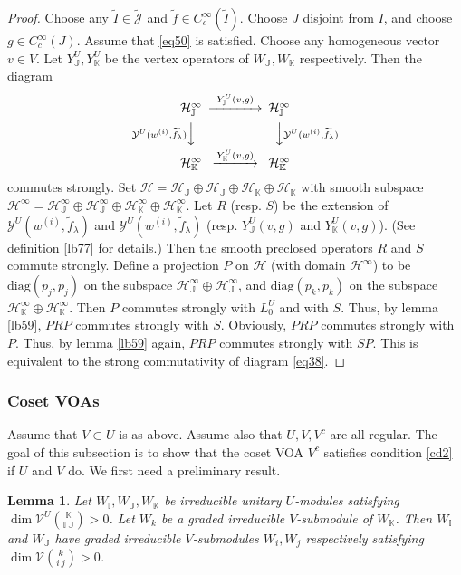 \documentclass[12pt,a4paper]{article}
\theoremstyle{definition}
\theoremstyle{plain}
\newtheorem{lm}[df]{Lemma}
\newcommand{\mc}{\mathcal}
\newcommand{\wtd}{\widetilde}
\newcommand{\diag}{\mathrm{diag}}
\newcommand{\Jtd}{\widetilde{\mathcal J}}
\newcommand{\mbb}{\mathbb}
\numberwithin{equation}{subsection}
\begin{document}
\begin{proof}
	Choose any $\wtd I\in\Jtd$ and $\wtd f\in C_c^\infty(\wtd I)$. Choose $J$ disjoint from $I$, and choose $g\in C_c^\infty(J)$. Assume that \eqref{eq50} is satisfied. Choose any homogeneous vector $v\in V$. Let $Y_{\mbb J}^U,Y_{\mbb K}^U$ be the vertex operators of $W_{\mbb J},W_{\mbb K}$ respectively. Then the diagram
	\begin{align}
	\begin{CD}
	\mc H_{\mbb J}^\infty @>~Y_{\mbb J}^U(v,g)~>> \mc H_{\mbb J}^\infty\\
	@V \mc Y^U(w^{(i)},\wtd f_\lambda)  VV @VV \mc Y^U(w^{(i)},\wtd f_\lambda) V\\
	\mc H_{\mbb K}^\infty @> Y^U_{\mbb K}(v,g)>> \mc H_{\mbb K}^\infty
	\end{CD}
	\end{align}	
	commutes strongly. Set $\mc H=\mc H_{\mbb J}\oplus \mc H_{\mbb J}\oplus \mc H_{\mbb K}\oplus \mc H_{\mbb K}$ with smooth subspace $\mc H^\infty=\mc H_{\mbb J}^\infty\oplus \mc H_{\mbb J}^\infty\oplus \mc H_{\mbb K}^\infty\oplus \mc H_{\mbb K}^\infty$. Let $R$  (resp. $S$) be  the extension of  $\mc Y^U(w^{(i)},\wtd f_\lambda)$ and $\mc Y^U(w^{(i)},\wtd f_\lambda)$ (resp. $Y_{\mbb J}^U(v,g)$ and $Y_{\mbb K}^U(v,g)$). (See definition \ref{lb77} for details.) Then the smooth preclosed operators $R$ and $S$ commute strongly. Define a projection $P$ on $\mc H$ (with domain $\mc H^\infty$) to be $\diag(p_j,p_j)$ on the subspace $\mc H_{\mbb J}^\infty\oplus \mc H_{\mbb J}^\infty$, and $\diag(p_k,p_k)$ on the subspace $\mc H_{\mbb K}^\infty\oplus \mc H_{\mbb K}^\infty$. Then $P$ commutes strongly with $L^U_0$ and with $S$. Thus, by lemma \ref{lb59}, $PRP$ commutes strongly with $S$. Obviously, $PRP$  commutes strongly with $P$. Thus, by lemma \ref{lb59} again, $PRP$ commutes strongly with $SP$. This is equivalent to the strong commutativity of diagram \eqref{eq38}.
\end{proof}



\subsubsection*{Coset VOAs}

Assume that $V\subset U$ is as above. Assume also that  $U,V,V^c$ are all regular. The goal of this subsection is to show that the coset VOA $V^c$ satisfies condition \ref{cd2} if $U$ and $V$ do. We first need a preliminary result.

\begin{lm}\label{lb89}
Let $W_{\mbb I},W_{\mbb J},W_{\mbb K}$ be irreducible unitary $U$-modules satisfying $\dim\mc V^U{\mbb K\choose\mbb I~\mbb J}>0$. Let $W_k$ be a graded irreducible  $V$-submodule of $W_{\mbb K}$. Then $W_{\mbb I}$ and $W_{\mbb J}$ have graded irreducible $V$-submodules $W_i,W_j$ respectively satisfying $\dim\mc V{k\choose i~j}>0$.
\end{lm}
\end{document}
